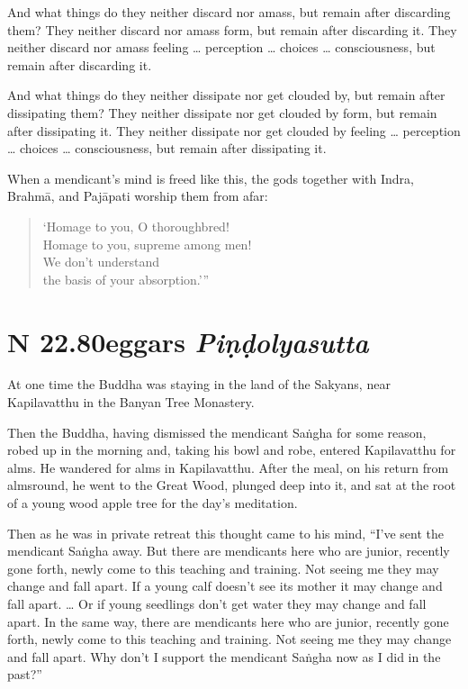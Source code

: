 \documentclass[12pt,openany]{book}%
\newcommand*{\suttatitleacronym}[1]{\smaller[2]{#1}\vspace*{.3em}}
\newcommand*{\suttatitletranslation}[1]{\linebreak{#1}}
\newcommand*{\suttatitleroot}[1]{\linebreak\smaller[2]\itshape{#1}}
\newcommand*{\tocacronym}[1]{\hspace*{-3.3em}{#1}\quad}
\newcommand*{\toctranslation}[1]{#1}
\newcommand*{\tocroot}[1]{(\textit{#1})}
\begin{document}
And what things do they neither discard nor amass, but remain after discarding them? They neither discard nor amass form, but remain after discarding it. They neither discard nor amass feeling … perception … choices … consciousness, but remain after discarding it. 

And what things do they neither dissipate nor get clouded by, but remain after dissipating them? They neither dissipate nor get clouded by form, but remain after dissipating it. They neither dissipate nor get clouded by feeling … perception … choices … consciousness, but remain after dissipating it. 

When a mendicant’s mind is freed like this, the gods together with Indra, \textsanskrit{Brahmā}, and \textsanskrit{Pajāpati} worship them from afar: 

\begin{verse}%
‘Homage to you, O thoroughbred! \\
Homage to you, supreme among men! \\
We don’t understand \\
the basis of your absorption.’” 

%
\end{verse}

%
\section*{{\suttatitleacronym SN 22.80}{\suttatitletranslation Beggars }{\suttatitleroot Piṇḍolyasutta}}
\addcontentsline{toc}{section}{\tocacronym{SN 22.80} \toctranslation{Beggars } \tocroot{Piṇḍolyasutta}}

At one time the Buddha was staying in the land of the Sakyans, near Kapilavatthu in the Banyan Tree Monastery. 

Then the Buddha, having dismissed the mendicant \textsanskrit{Saṅgha} for some reason, robed up in the morning and, taking his bowl and robe, entered Kapilavatthu for alms. He wandered for alms in Kapilavatthu. After the meal, on his return from almsround, he went to the Great Wood, plunged deep into it, and sat at the root of a young wood apple tree for the day’s meditation. 

Then as he was in private retreat this thought came to his mind, “I’ve sent the mendicant \textsanskrit{Saṅgha} away. But there are mendicants here who are junior, recently gone forth, newly come to this teaching and training. Not seeing me they may change and fall apart. If a young calf doesn’t see its mother it may change and fall apart. … Or if young seedlings don’t get water they may change and fall apart. In the same way, there are mendicants here who are junior, recently gone forth, newly come to this teaching and training. Not seeing me they may change and fall apart. Why don’t I support the mendicant \textsanskrit{Saṅgha} now as I did in the past?” 
\end{document}
